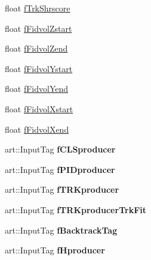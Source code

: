 \begin{DoxyCompactItemize}
\item 
float \hyperlink{classselection_1_1NuMuSelection_ad112dbbc5a443a1ff5408c512788a154}{f\+Trk\+Shrscore}
\item 
float \hyperlink{classselection_1_1NuMuSelection_afd0602fc9b69392ffb8dbc36c6ff3e61}{f\+Fidvol\+Zstart}
\item 
float \hyperlink{classselection_1_1NuMuSelection_adae665ca6cf1ece4b7e00b345cebbfe3}{f\+Fidvol\+Zend}
\item 
float \hyperlink{classselection_1_1NuMuSelection_a68277003f5211d751a5965dc990ff661}{f\+Fidvol\+Ystart}
\item 
float \hyperlink{classselection_1_1NuMuSelection_ac07847d191d7d4db8267d89e0caab414}{f\+Fidvol\+Yend}
\item 
float \hyperlink{classselection_1_1NuMuSelection_a5f015a245b7a149756f787f2dab9fcc7}{f\+Fidvol\+Xstart}
\item 
float \hyperlink{classselection_1_1NuMuSelection_ab57daae1ee3ed13b58016eb68f0d6712}{f\+Fidvol\+Xend}
\item 
art\+::\+Input\+Tag {\bfseries f\+C\+L\+Sproducer}\hypertarget{classselection_1_1NuMuSelection_a2b42e74d57763e5b49f6fd1123bdb154}{}\label{classselection_1_1NuMuSelection_a2b42e74d57763e5b49f6fd1123bdb154}

\item 
art\+::\+Input\+Tag {\bfseries f\+P\+I\+Dproducer}\hypertarget{classselection_1_1NuMuSelection_a54685a2abfa66dbf5a08cc58e215c013}{}\label{classselection_1_1NuMuSelection_a54685a2abfa66dbf5a08cc58e215c013}

\item 
art\+::\+Input\+Tag {\bfseries f\+T\+R\+Kproducer}\hypertarget{classselection_1_1NuMuSelection_aa458d765d2088552375177afa2006b08}{}\label{classselection_1_1NuMuSelection_aa458d765d2088552375177afa2006b08}

\item 
art\+::\+Input\+Tag {\bfseries f\+T\+R\+Kproducer\+Trk\+Fit}\hypertarget{classselection_1_1NuMuSelection_af12bf233739d67542d69294088a68336}{}\label{classselection_1_1NuMuSelection_af12bf233739d67542d69294088a68336}

\item 
art\+::\+Input\+Tag {\bfseries f\+Backtrack\+Tag}\hypertarget{classselection_1_1NuMuSelection_a05394c48def95fa5e6334d48e278fe07}{}\label{classselection_1_1NuMuSelection_a05394c48def95fa5e6334d48e278fe07}

\item 
art\+::\+Input\+Tag {\bfseries f\+Hproducer}\hypertarget{classselection_1_1NuMuSelection_a727573fc11e39692e79d8436b04c3ba9}{}\label{classselection_1_1NuMuSelection_a727573fc11e39692e79d8436b04c3ba9}


\end{DoxyCompactItemize}
